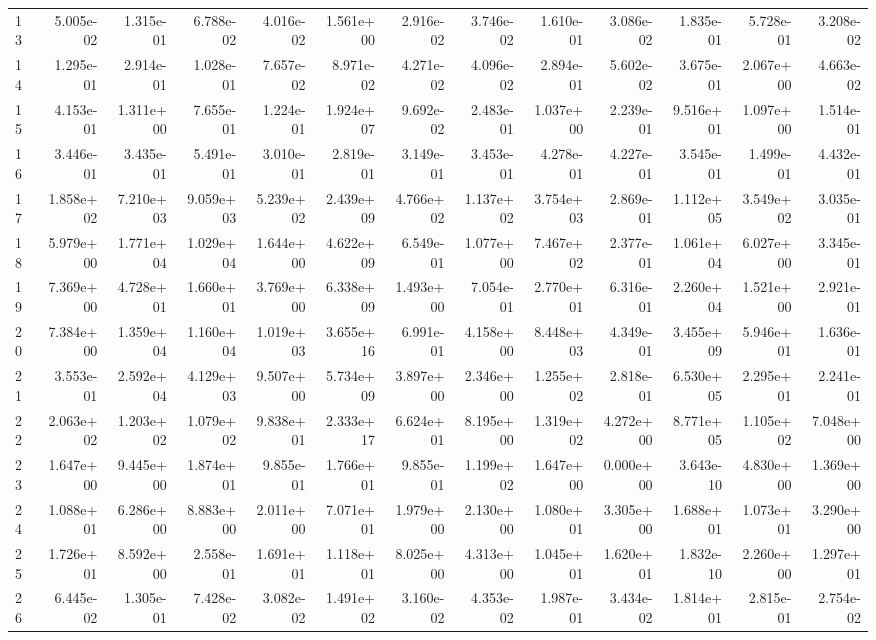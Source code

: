 \begin{table}
\begin{tabular}{lrrrrrrrrrrrr}
13 & 5.005e-02 & 1.315e-01 & 6.788e-02 & 4.016e-02 & 1.561e+00 & 2.916e-02 & 3.746e-02 & 1.610e-01 & 3.086e-02 & 1.835e-01 & 5.728e-01 & 3.208e-02 \\
14 & 1.295e-01 & 2.914e-01 & 1.028e-01 & 7.657e-02 & 8.971e-02 & 4.271e-02 & 4.096e-02 & 2.894e-01 & 5.602e-02 & 3.675e-01 & 2.067e+00 & 4.663e-02 \\
15 & 4.153e-01 & 1.311e+00 & 7.655e-01 & 1.224e-01 & 1.924e+07 & 9.692e-02 & 2.483e-01 & 1.037e+00 & 2.239e-01 & 9.516e+01 & 1.097e+00 & 1.514e-01 \\
16 & 3.446e-01 & 3.435e-01 & 5.491e-01 & 3.010e-01 & 2.819e-01 & 3.149e-01 & 3.453e-01 & 4.278e-01 & 4.227e-01 & 3.545e-01 & 1.499e-01 & 4.432e-01 \\
17 & 1.858e+02 & 7.210e+03 & 9.059e+03 & 5.239e+02 & 2.439e+09 & 4.766e+02 & 1.137e+02 & 3.754e+03 & 2.869e-01 & 1.112e+05 & 3.549e+02 & 3.035e-01 \\
18 & 5.979e+00 & 1.771e+04 & 1.029e+04 & 1.644e+00 & 4.622e+09 & 6.549e-01 & 1.077e+00 & 7.467e+02 & 2.377e-01 & 1.061e+04 & 6.027e+00 & 3.345e-01 \\
19 & 7.369e+00 & 4.728e+01 & 1.660e+01 & 3.769e+00 & 6.338e+09 & 1.493e+00 & 7.054e-01 & 2.770e+01 & 6.316e-01 & 2.260e+04 & 1.521e+00 & 2.921e-01 \\
20 & 7.384e+00 & 1.359e+04 & 1.160e+04 & 1.019e+03 & 3.655e+16 & 6.991e-01 & 4.158e+00 & 8.448e+03 & 4.349e-01 & 3.455e+09 & 5.946e+01 & 1.636e-01 \\
21 & 3.553e-01 & 2.592e+04 & 4.129e+03 & 9.507e+00 & 5.734e+09 & 3.897e+00 & 2.346e+00 & 1.255e+02 & 2.818e-01 & 6.530e+05 & 2.295e+01 & 2.241e-01 \\
22 & 2.063e+02 & 1.203e+02 & 1.079e+02 & 9.838e+01 & 2.333e+17 & 6.624e+01 & 8.195e+00 & 1.319e+02 & 4.272e+00 & 8.771e+05 & 1.105e+02 & 7.048e+00 \\
23 & 1.647e+00 & 9.445e+00 & 1.874e+01 & 9.855e-01 & 1.766e+01 & 9.855e-01 & 1.199e+02 & 1.647e+00 & 0.000e+00 & 3.643e-10 & 4.830e+00 & 1.369e+00 \\
24 & 1.088e+01 & 6.286e+00 & 8.883e+00 & 2.011e+00 & 7.071e+01 & 1.979e+00 & 2.130e+00 & 1.080e+01 & 3.305e+00 & 1.688e+01 & 1.073e+01 & 3.290e+00 \\
25 & 1.726e+01 & 8.592e+00 & 2.558e-01 & 1.691e+01 & 1.118e+01 & 8.025e+00 & 4.313e+00 & 1.045e+01 & 1.620e+01 & 1.832e-10 & 2.260e+00 & 1.297e+01 \\
26 & 6.445e-02 & 1.305e-01 & 7.428e-02 & 3.082e-02 & 1.491e+02 & 3.160e-02 & 4.353e-02 & 1.987e-01 & 3.434e-02 & 1.814e+01 & 2.815e-01 & 2.754e-02 \\

\end{tabular}
\end{table}
